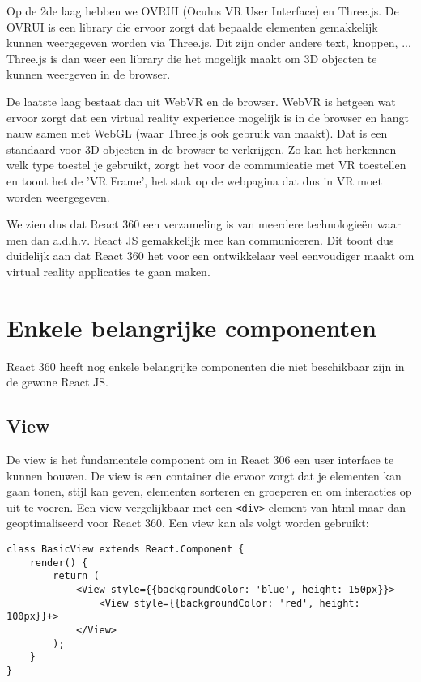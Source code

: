 Op de 2de laag hebben we OVRUI (Oculus VR User Interface) en Three.js. De OVRUI is een library die ervoor zorgt dat bepaalde elementen gemakkelijk kunnen weergegeven worden via Three.js. Dit zijn onder andere text, knoppen, ... Three.js is dan weer een library die het mogelijk maakt om 3D objecten te kunnen weergeven in de browser.

De laatste laag bestaat dan uit WebVR en de browser. WebVR is hetgeen wat ervoor zorgt dat een virtual reality experience mogelijk is in de browser en hangt nauw samen met WebGL (waar Three.js ook gebruik van maakt). Dat is een standaard voor 3D objecten in de browser te verkrijgen. Zo kan het herkennen welk type toestel je gebruikt, zorgt het voor de communicatie met VR toestellen en toont het de 'VR Frame', het stuk op de webpagina dat dus in VR moet worden weergegeven. 

We zien dus dat React 360 een verzameling is van meerdere technologieën waar men dan a.d.h.v. React JS gemakkelijk mee kan communiceren. Dit toont dus duidelijk aan dat React 360 het voor een ontwikkelaar veel eenvoudiger maakt om virtual reality applicaties te gaan maken.

\section{Enkele belangrijke componenten}
\label{sec:reactvr-componenten}
React 360 heeft nog enkele belangrijke componenten die niet beschikbaar zijn in de gewone React JS.

\subsection{View}
\label{subsec:view}
De view is het fundamentele component om in React 306 een user interface te kunnen bouwen. De view is een container die ervoor zorgt dat je elementen kan gaan tonen, stijl kan geven, elementen sorteren en groeperen en om interacties op uit te voeren. Een view vergelijkbaar met een \lstinline[basicstyle=\ttfamily\color{red}]|<div>| element van html maar dan geoptimaliseerd voor React 360. Een view kan als volgt worden gebruikt:

\begin{lstlisting}[frame=single, caption=Een component die een View teruggeeft.]
class BasicView extends React.Component {
	render() {
		return (
			<View style={{backgroundColor: 'blue', height: 150px}}>
				<View style={{backgroundColor: 'red', height: 100px}}+>
			</View>
		);
	}
}
\end{lstlisting}

